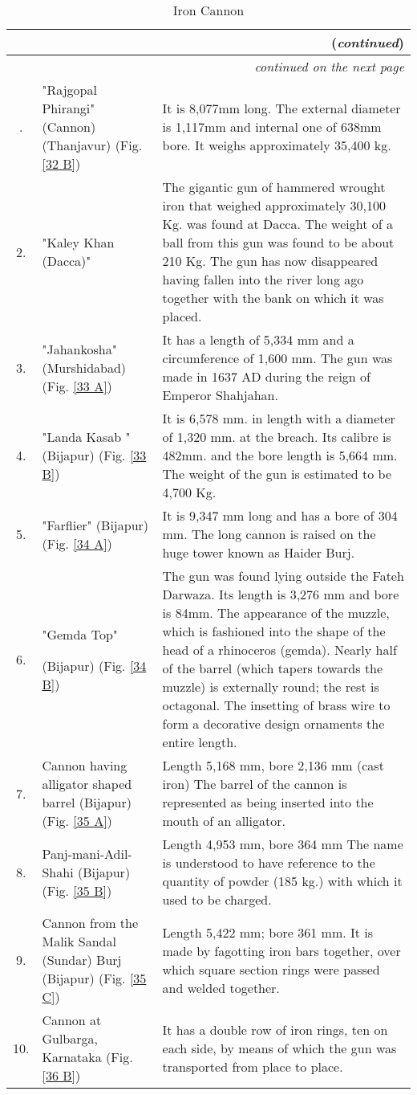  {\setcounter{table}{1}
\renewcommand{\thetable}{V.\arabic{table}}
 {\setlength\tabcolsep{2pt}
\begin{longtable}{|c|p{3.5cm}|p{5cm}|}
\caption{Iron Cannon}\label{table V.2}\\
\hline
\endfirsthead
\multicolumn{3}{r}{(\textit{continued})}\\[5pt]
\hline
\endhead
\hline
\multicolumn{3}{r}{\small\itshape continued on the next page}\\
\endfoot
\endlastfoot
1. & "Rajgopal Phirangi" (Cannon) (Thanjavur) (Fig. \ref{32 B}) & It is 8,077mm long. The external diameter is 1,117mm and internal one of 638mm bore. It weighs approximately 35,400 kg.\\
2. & "Kaley Khan (Dacca)" & The gigantic gun of hammered wrought iron that weighed approximately 30,100 Kg. was found at Dacca. The weight of a ball from this gun was found to be about 210 Kg. The gun has now disappeared having fallen into the river long ago together with the bank on which it was placed.\\
3. & "Jahankosha" (Murshidabad) (Fig. \ref{33 A}) & It has a length of 5,334 mm and a circumference of 1,600 mm. The gun was made in 1637 AD during the reign of Emperor Shahjahan.\\
4. & "Landa Kasab " (Bijapur) (Fig. \ref{33 B}) & It is 6,578 mm. in length with a diameter of 1,320 mm. at the breach. Its calibre is 482mm. and the bore length is 5,664 mm. The weight of the gun is estimated to be 4,700 Kg.\\
5. & "Farflier" (Bijapur) (Fig. \ref{34 A}) & It is 9,347 mm long and has a bore of 304 mm. The long cannon is raised on the huge tower known as   Haider Burj. \\
6. & "Gemda Top" \par (Bijapur) (Fig. \ref{34 B}) & The gun was found lying outside the Fateh Darwaza. Its length is 3,276 mm and bore is 84mm.  The appear­ance of the muzzle, which is fashioned into the shape of the head of a rhino­ceros (gemda). Nearly half of the barrel (which tapers towards the muzzle) is externally round; the rest is octagonal. The insetting of brass wire to form a decorative design ornaments the entire length.\\
7. & Cannon having alligator shaped barrel (Bijapur) (Fig. \ref{35 A}) & Length 5,168 mm, bore 2,136 mm (cast iron) The barrel of the cannon is represented as being inserted into the mouth of an alligator. \\
8. & Panj-mani-Adil-Shahi  (Bijapur) (Fig. \ref{35 B}) & Length 4,953 mm, bore 364 mm The name is understood to have reference to the quantity of powder (185 kg.) with which it used to be charged.\\
9. & Cannon  from the Malik Sandal (Sundar) Burj (Bijapur) (Fig. \ref{35 C}) & Length 5,422 mm; bore 361 mm. It is made by fagotting iron bars together, over which square section rings were passed and welded together.\\
10. & Cannon at Gulbarga, Karnataka (Fig. \ref{36 B}) & It has a double row of iron rings, ten on each side, by means of which the gun was transported from place to place.\\
\hline
\end{longtable}
}}

